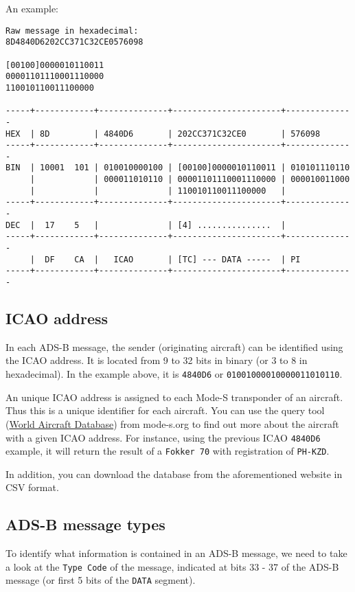 An example:

\begin{verbatim}
Raw message in hexadecimal:
8D4840D6202CC371C32CE0576098

[00100]0000010110011
00001101110001110000
110010110011100000

-----+------------+--------------+----------------------+--------------
HEX  | 8D         | 4840D6       | 202CC371C32CE0       | 576098
-----+------------+--------------+----------------------+--------------
BIN  | 10001  101 | 010010000100 | [00100]0000010110011 | 010101110110
     |            | 000011010110 | 00001101110001110000 | 000010011000
     |            |              | 110010110011100000   |
-----+------------+--------------+----------------------+--------------
DEC  |  17    5   |              | [4] ...............  |
-----+------------+--------------+----------------------+--------------
     |  DF    CA  |   ICAO       | [TC] --- DATA -----  | PI
-----+------------+--------------+----------------------+--------------
\end{verbatim}

\subsection{ICAO address}\label{icao-address}

In each ADS-B message, the sender (originating aircraft) can be identified using the ICAO address. It is located from 9 to 32 bits in binary (or 3 to 8 in hexadecimal). In the example above, it is \texttt{4840D6} or \texttt{01001000010000011010110}.

An unique ICAO address is assigned to each Mode-S transponder of an aircraft. Thus this is a unique identifier for each aircraft. You can use the query tool (\href{https://junzis.com/adb/}{World Aircraft Database}) from mode-s.org to find out more about the aircraft with a given ICAO address. For instance, using the previous ICAO \texttt{4840D6} example, it will return the result of a \texttt{Fokker\ 70} with registration of \texttt{PH-KZD}.

In addition, you can download the database from the aforementioned website in CSV format.

\subsection{ADS-B message types}\label{ads-b-message-types}

To identify what information is contained in an ADS-B message, we need to take a look at the \texttt{Type\ Code} of the message, indicated at bits 33 - 37 of the ADS-B message (or first 5 bits of the \texttt{DATA} segment).


